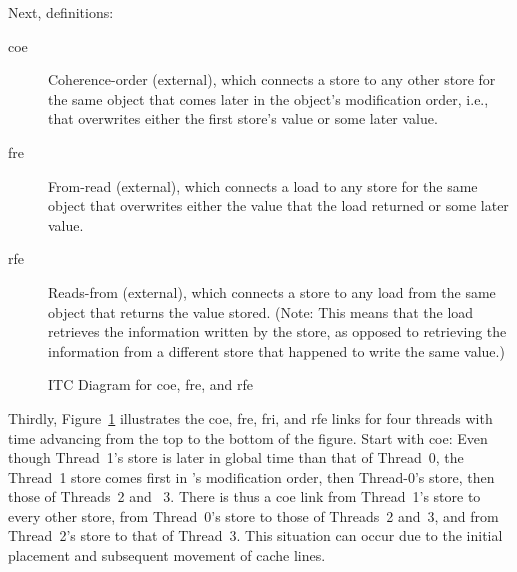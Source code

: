 \documentclass[10]{article}
\begin{document}
Next, definitions:
\begin{description}
\item[coe]
	Coherence-order (external), which connects a store to any other store
	for the same object that comes later in the object's
	modification order, i.e., that overwrites either the first store's
	value or some later value.
\item[fre]
	From-read (external), which connects a load to any store for
	the same object that overwrites either the value that the load
	returned or some later value.
\item[rfe]
	Reads-from (external), which connects a store to any load from
	the same object that returns the value stored.
	(Note: This means that the load retrieves the information
	written by the store, as opposed to retrieving the information
	from a different store that happened to write the same value.)
\end{description}

\begin{figure}[tb]
\begin{center}
\caption{ITC Diagram for coe, fre, and rfe}
\label{fig:ITC Diagram for coe, fre, and rfe}
\end{center}
\end{figure}

Thirdly, Figure~\ref{fig:ITC Diagram for coe, fre, and rfe} illustrates
the coe, fre, fri, and rfe links for four threads with time advancing
from the top to the bottom of the figure.  Start with coe: Even though
Thread~1's store is later in global time than that of Thread~0, the
Thread~1 store comes first in 's modification order, then Thread-0's
store, then those of Threads~2 and ~3.
There is thus a coe link from Thread~1's store to every other store,
from Thread~0's store to those of Threads~2 and~3, and from Thread~2's
store to that of Thread~3.
This situation can occur due to the initial placement and subsequent
movement of cache lines.
\end{document}
